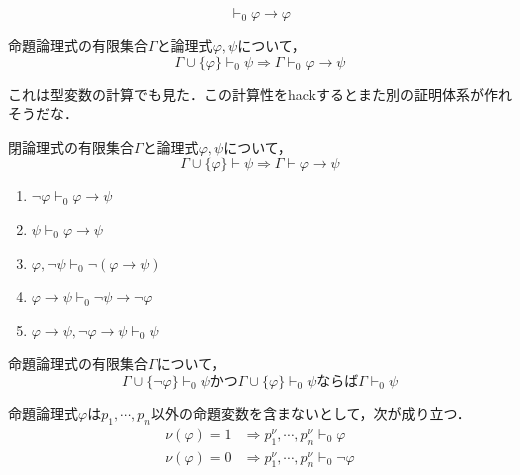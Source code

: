 \documentclass[uplatex, dvipdfmx]{jsreport}
\begin{document}
\begin{lemma}
    \[\vdash_0\varphi\to\varphi\]
\end{lemma}

\begin{theorem}
    命題論理式の有限集合$\Gamma$と論理式$\varphi,\psi$について，
    \[ \Gamma\cup\{\varphi\}\vdash_0\psi\Rightarrow\Gamma\vdash_0\varphi\to\psi \]
\end{theorem}
\begin{remark}
    これは型変数の計算でも見た．この計算性をhackするとまた別の証明体系が作れそうだな．
\end{remark}

\begin{corollary}
    閉論理式の有限集合$\Gamma$と論理式$\varphi,\psi$について，
    \[ \Gamma\cup\{\varphi\}\vdash\psi\Rightarrow\Gamma\vdash\varphi\to\psi \]
\end{corollary}

\begin{lemma}\mbox{}
    \begin{enumerate}
        \item $\lnot\varphi\vdash_0\varphi\to\psi$
        \item $\psi\vdash_0\varphi\to\psi$
        \item $\varphi,\lnot\psi\vdash_0\lnot(\varphi\to\psi)$
        \item $\varphi\to\psi\vdash_0\lnot\psi\to\lnot\varphi$
        \item $\varphi\to\psi,\lnot\varphi\to\psi\vdash_0\psi$
    \end{enumerate}
\end{lemma}

\begin{lemma}
    命題論理式の有限集合$\Gamma$について，
    \[ \Gamma\cup\{\lnot\varphi\}\vdash_0\psi かつ\Gamma\cup\{\varphi\}\vdash_0\psi ならば \Gamma\vdash_0\psi \]
\end{lemma}

\begin{lemma}
    命題論理式$\varphi$は$p_1,\cdots,p_n$以外の命題変数を含まないとして，次が成り立つ．
    \begin{align*}
        \nu(\varphi)=1&\Rightarrow p_1^\nu,\cdots,p_n^\nu\vdash_0\varphi\\
        \nu(\varphi)=0&\Rightarrow p_1^\nu,\cdots,p^\nu_n\vdash_0\lnot\varphi
    \end{align*}
\end{lemma}
\end{document}
